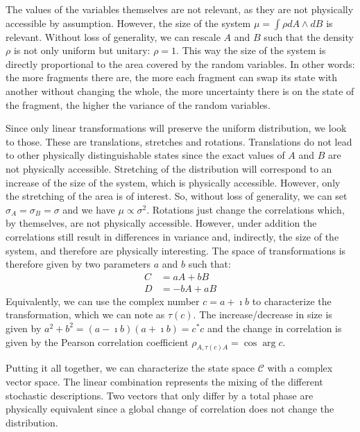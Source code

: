 \documentclass[11pt,letterpaper,fleqn]{memoir} %
\begin{document}
The values of the variables themselves are not relevant, as they are not physically accessible by assumption. However, the size of the system $\mu = \int \rho dA \wedge dB$ is relevant. Without loss of generality, we can rescale $A$ and $B$ such that the density $\rho$ is not only uniform but unitary: $\rho = 1$. This way the size of the system is directly proportional to the area covered by the random variables. In other words: the more fragments there are, the more each fragment can swap its state with another without changing the whole, the more uncertainty there is on the state of the fragment, the higher the variance of the random variables.

Since only linear transformations will preserve the uniform distribution, we look to those. These are translations, stretches and rotations. Translations do not lead to other physically distinguishable states since the exact values of $A$ and $B$ are not physically accessible. Stretching of the distribution will correspond to an increase of the size of the system, which is physically accessible. However, only the stretching of the area is of interest. So, without loss of generality, we can set $\sigma_A = \sigma_B = \sigma$ and we have $\mu \propto \sigma^2$. Rotations just change the correlations which, by themselves, are not physically accessible. However, under addition the correlations still result in differences in variance and, indirectly, the size of the system, and therefore are physically interesting. The space of transformations is therefore given by two parameters $a$ and $b$ such that:
\begin{equation}
\begin{aligned}
C &= a A + b B \\
D &= -b A + a B
\end{aligned}
\end{equation}
Equivalently, we can use the complex number $c = a + \imath b$ to characterize the transformation, which we can note as $\tau(c)$. The increase/decrease in size is given by $a^2 + b^2 = (a - \imath b) (a + \imath b) = c^* c$ and the change in correlation is given by the Pearson correlation coefficient $\rho_{A,\tau(c) A} = \cos \arg c$.

Putting it all together, we can characterize the state space $\mathcal{C}$ with a complex vector space. The linear combination represents the mixing of the different stochastic descriptions. Two vectors that only differ by a total phase are physically equivalent since a global change of correlation does not change the distribution.
\end{document}
